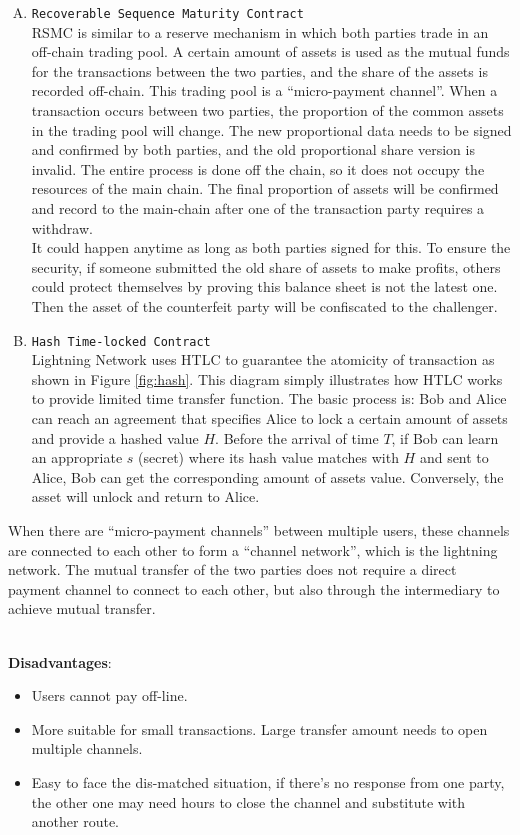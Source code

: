 \begin{enumerate}[A.]
    \item \texttt{Recoverable Sequence Maturity Contract} \\
    RSMC is similar to a reserve mechanism in which both parties trade in an off-chain trading pool. A certain amount of assets is used as the mutual funds for the transactions between the two parties, and the share of the assets is recorded off-chain. This trading pool is a “micro-payment channel”. When a transaction occurs between two parties, the proportion of the common assets in the trading pool will change. The new proportional data needs to be signed and confirmed by both parties, and the old proportional share version is invalid. The entire process is done off the chain, so it does not occupy the resources of the main chain. The final proportion of assets will be confirmed and record to the main-chain after one of the transaction party requires a withdraw.\\
    It could happen anytime as long as both parties signed for this. To ensure the security, if someone submitted the old share of assets to make profits, others could protect themselves by proving this balance sheet is not the latest one. Then the asset of the counterfeit party will be confiscated to the challenger.
    \item \texttt{Hash Time-locked Contract}\\
     Lightning Network uses HTLC to guarantee the atomicity of transaction as shown in Figure \ref{fig:hash}. This diagram simply illustrates how HTLC works to provide limited time transfer function. The basic process is: Bob and Alice can reach an agreement that specifies Alice to lock a certain amount of assets and provide a hashed value $H$. Before the arrival of time $T$, if Bob can learn an appropriate $s$ (secret) where its hash value matches with $H$ and sent to Alice, Bob can get the corresponding amount of assets value. Conversely, the asset will unlock and return to Alice.
\end{enumerate}
\noindent When there are “micro-payment channels” between multiple users, these channels are connected to each other to form a “channel network”, which is the lightning network. The mutual transfer of the two parties does not require a direct payment channel to connect to each other, but also through the intermediary to achieve mutual transfer. \\ \\
\noindent \begin{large}
\textbf{Disadvantages}:
\end{large}
\begin{itemize}
    \item Users cannot pay off-line. 
    \item More suitable for small transactions. Large transfer amount needs to open multiple channels.
    \item Easy to face the dis-matched situation, if there's no response from one party, the other one may need hours to close the channel and substitute with another route.
\end{itemize}


